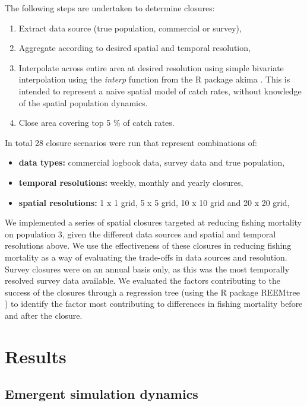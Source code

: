 \documentclass[preprint]{elsarticle}
\begin{document}
The following steps are undertaken to determine closures:

\begin{enumerate}
	\item Extract data source (true population, commercial or survey), 
	\item Aggregate according to desired spatial and temporal resolution,
	\item Interpolate across entire area at desired resolution using simple
		bivariate interpolation using the \emph{interp} function from
		the R package akima \citep{Akima2006}. This is intended to
		represent a naive spatial model of catch rates, without
		knowledge of the spatial population dynamics.
	\item Close area covering top 5 \% of catch rates.
\end{enumerate}
In total 28 closure scenarios were run that represent combinations of:

\begin{itemize}
	\item \textbf{data types:} commercial logbook data, survey data and
		true population,
	\item \textbf{temporal resolutions:} weekly, monthly and yearly
		closures,
	\item \textbf{spatial resolutions:} 1 x 1 grid, 5 x 5 grid, 10 x 10
		grid and 20 x 20 grid,
	
\end{itemize}

We implemented a series of spatial closures targeted at reducing fishing
mortality on population 3, given the different data sources and spatial and
temporal resolutions above. We use the effectiveness of these closures in
reducing fishing mortality as a way of evaluating the trade-offs in data
sources and resolution. Survey closures were on an annual basis only, as this
was the most temporally resolved survey data available. We evaluated the
factors contributing to the success of the closures through a regression tree
(using the R package REEMtree \citep{Sela2012}) to identify the factor most
contributing to differences in fishing mortality before and after the closure.

\section{Results}

\subsection{Emergent simulation dynamics}
\end{document}
